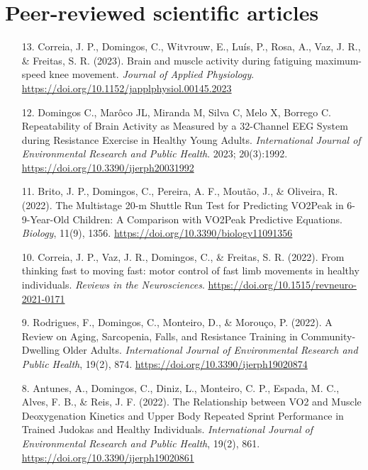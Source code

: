 \section*{Peer-reviewed scientific articles}

\begin{enumerate}

  \item[13.] Correia, J. P., Domingos, C., Witvrouw, E., Luís, P., Rosa, A., Vaz, J. R., & Freitas, S. R. (2023). Brain and muscle activity during fatiguing maximum-speed knee movement. \emph{Journal of Applied Physiology}. \url{https://doi.org/10.1152/japplphysiol.00145.2023}

  \item[12.] Domingos C., Marôco JL, Miranda M, Silva C, Melo X, Borrego C. Repeatability of Brain Activity as Measured by a 32-Channel EEG System during Resistance Exercise in Healthy Young Adults. \emph{International Journal of Environmental Research and Public Health}. 2023; 20(3):1992. \url{https://doi.org/10.3390/ijerph20031992}

  \item[11.] Brito, J. P., Domingos, C., Pereira, A. F., Moutão, J., \& Oliveira, R. (2022). The Multistage 20-m Shuttle Run Test for Predicting VO2Peak in 6-9-Year-Old Children: A Comparison with VO2Peak Predictive Equations. \emph{Biology}, 11(9), 1356. \url{https://doi.org/10.3390/biology11091356}

  \item[10.] Correia, J. P., Vaz, J. R., Domingos, C., \& Freitas, S. R. (2022). From thinking fast to moving fast: motor control of fast limb movements in healthy individuals. \emph{Reviews in the Neurosciences}. \url{https://doi.org/10.1515/revneuro-2021-0171}

  \item[9.] Rodrigues, F., Domingos, C., Monteiro, D., \& Morouço, P. (2022). A Review on Aging, Sarcopenia, Falls, and Resistance Training in Community-Dwelling Older Adults. \emph{International Journal of Environmental Research and Public Health}, 19(2), 874. \url{https://doi.org/10.3390/ijerph19020874}

  \item[8.] Antunes, A., Domingos, C., Diniz, L., Monteiro, C. P., Espada, M. C., Alves, F. B., \& Reis, J. F. (2022). The Relationship between VO2 and Muscle Deoxygenation Kinetics and Upper Body Repeated Sprint Performance in Trained Judokas and Healthy Individuals. \emph{International Journal of Environmental Research and Public Health}, 19(2), 861. \url{https://doi.org/10.3390/ijerph19020861}


\end{enumerate}
